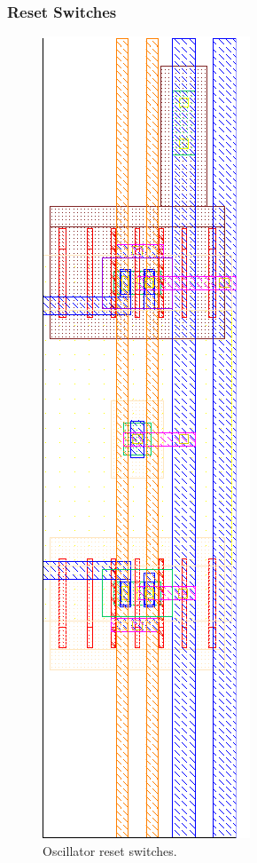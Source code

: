 			\subsubsection{Reset Switches}
				\begin{figure}[htb!]
				        \centering
				        \includegraphics[height=0.4\textheight, angle=0]{./figs/layout/ro_sw}
				    \caption{Oscillator reset switches.}
				\end{figure}
